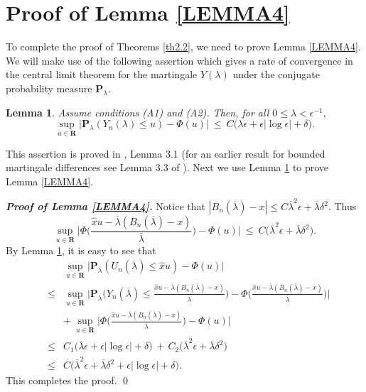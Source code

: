 \documentclass{gSTA2e}
\theoremstyle{plain}
\newtheorem{lemma}[theorem]{Lemma}
\theoremstyle{definition}
\theoremstyle{remark}
\begin{document}
\section{Proof of  Lemma \ref{LEMMA4}}\label{sec6}
 To complete the proof of Theorems \ref{th2.2}, we need to prove Lemma \ref{LEMMA4}.
 We will make use of the following assertion   which gives
 a rate of convergence in the central limit theorem for the
martingale $Y( \lambda  )$ under the conjugate probability measure $\mathbf{P}_{ \lambda  }.$
\begin{lemma}\label{lem3}
Assume conditions (A1) and (A2). Then, for all $0 \leq \lambda < \epsilon^{-1},$
\[
\sup_{u\in \mathbf{R}}\Big| \mathbf{P}_\lambda (Y_n(\lambda )\leq u)-\Phi (u)\Big| \ \leq \
C \Big( \lambda \epsilon +\epsilon \left| \log  \epsilon
 \right| +   \delta \Big) .
\]
\end{lemma}
This assertion is proved in  \cite{FGL13}, Lemma 3.1 (for an earlier result for
bounded martingale differences see Lemma 3.3 of  \cite{GH00}).  Next we use  Lemma \ref{lem3} to prove Lemma \ref{LEMMA4}.

\vspace{0.2cm}

\noindent\emph{\textbf{Proof of  Lemma \ref{LEMMA4}.}}
Notice that $| B_n(\overline{\lambda})-x | \leq C  \overline{\lambda}^2  \epsilon  +  \overline{\lambda} \delta^2 .$ Thus $$\sup_{u\in \mathbf{R}}\Big| \Phi \Big( \frac{\widehat{x}u  - \overline{\lambda} ( B_n(\overline{\lambda})-x   )}{\overline{\lambda} } \Big)  -\Phi ( u)\Big| \ \leq \
C \Big(  \overline{\lambda}^2  \epsilon  +  \overline{\lambda} \delta^2 \Big) .$$ By Lemma \ref{lem3}, it is easy to see that
\begin{eqnarray}
&&\sup_{u\in \mathbf{R}}\Big| \mathbf{P}_{\overline{\lambda}} (  U_n(\overline{\lambda} )   \leq  \widehat{x}u)-\Phi (  u)\Big|  \\
 &\leq &  \sup_{u\in \mathbf{R}}\Big| \mathbf{P}_{\overline{\lambda}} \Big ( Y_n(\overline{\lambda} )  \leq   \frac{\widehat{x}u  - \overline{\lambda} ( B_n(\overline{\lambda})-x   )}{\overline{\lambda} } \Big)-\Phi \Big(  \frac{\widehat{x}u  - \overline{\lambda} ( B_n(\overline{\lambda})-x   )}{\overline{\lambda} } \Big)\Big|  \nonumber \\
& &  + \ \sup_{u\in \mathbf{R}}\Big| \Phi \Big( \frac{\widehat{x}u  - \overline{\lambda} ( B_n(\overline{\lambda})-x   )}{\overline{\lambda} } \Big)  -\Phi ( u)\Big|   \nonumber  \\
&\leq &  C_1 \Big( \overline{\lambda} \epsilon +\epsilon \left| \log  \epsilon
 \right| +   \delta \Big) \, + \, C_2\Big(  \overline{\lambda}^2  \epsilon  +  \overline{\lambda} \delta^2 \Big)  \nonumber  \\
 &\leq &  C  \Big( \overline{\lambda}^2 \epsilon + \overline{\lambda} \delta^2 + \epsilon \left| \log  \epsilon
 \right| +   \delta \Big).   \nonumber
\end{eqnarray}
This completes the proof. \hfill\qed
\end{document}
